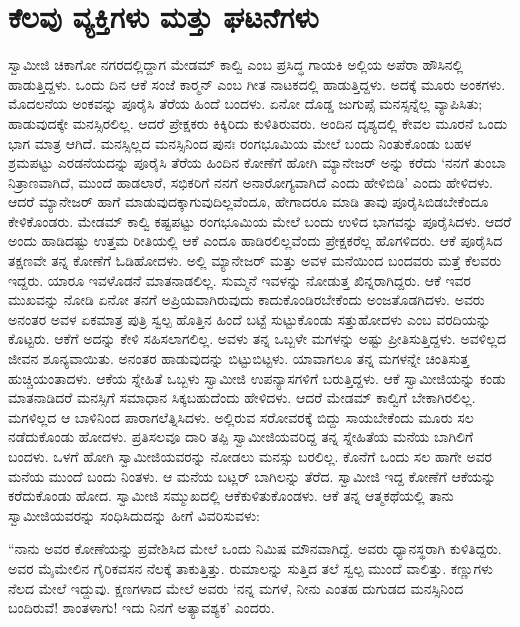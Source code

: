 
\chapter{ಕೆಲವು ವ್ಯಕ್ತಿಗಳು ಮತ್ತು ಘಟನೆಗಳು }

 ಸ್ವಾಮೀಜಿ ಚಿಕಾಗೋ ನಗರದಲ್ಲಿದ್ದಾಗ ಮೇಡಮ್ ಕಾಲ್ವಿ ಎಂಬ ಪ್ರಸಿದ್ಧ ಗಾಯಕಿ ಅಲ್ಲಿಯ ಅಪೆರಾ ಹೌಸಿನಲ್ಲಿ ಹಾಡುತ್ತಿದ್ದಳು. ಒಂದು ದಿನ ಆಕೆ ಸಂಜೆ ಕಾರ್‍ಮನ್ ಎಂಬ ಗೀತ ನಾಟಕದಲ್ಲಿ ಹಾಡುತ್ತಿದ್ದಳು. ಅದಕ್ಕೆ ಮೂರು ಅಂಕಗಳು. ಮೊದಲನೆಯ ಅಂಕವನ್ನು ಪೂರೈಸಿ ತೆರೆಯ ಹಿಂದೆ ಬಂದಳು. ಏನೋ ದೊಡ್ಡ ಜುಗುಪ್ಸೆ ಮನಸ್ಸನ್ನೆಲ್ಲ ವ್ಯಾಪಿಸಿತು; ಹಾಡುವುದಕ್ಕೇ ಮನಸ್ಸಿರಲಿಲ್ಲ. ಆದರೆ ಪ್ರೇಕ್ಷಕರು ಕಿಕ್ಕಿರಿದು ಕುಳಿತಿರುವರು. ಅಂದಿನ ದೃಶ್ಯದಲ್ಲಿ ಕೇವಲ ಮೂರನೆ ಒಂದು ಭಾಗ ಮಾತ್ರ ಆಗಿದೆ. ಮನಸ್ಸಿಲ್ಲದ ಮನಸ್ಸಿನಿಂದ ಪುನಃ ರಂಗಭೂಮಿಯ ಮೇಲೆ ಬಂದು ನಿಂತುಕೊಂಡು ಬಹಳ ಶ್ರಮಪಟ್ಟು ಎರಡನೆಯದನ್ನು ಪೂರೈಸಿ ತೆರೆಯ ಹಿಂದಿನ ಕೋಣೆಗೆ ಹೋಗಿ ಮ್ಯಾನೇಜರ್ ಅನ್ನು ಕರೆದು ‘ನನಗೆ ತುಂಬಾ ನಿತ್ರಾಣವಾಗಿದೆ, ಮುಂದೆ ಹಾಡಲಾರೆ, ಸಭಿಕರಿಗೆ ನನಗೆ ಅನಾರೋಗ್ಯವಾಗಿದೆ ಎಂದು ಹೇಳಿಬಿಡಿ’ ಎಂದು ಹೇಳಿದಳು. ಆದರೆ ಮ್ಯಾನೇಜರ್ ಹಾಗೆ ಮಾಡುವುದಕ್ಕಾಗುವುದಿಲ್ಲವೆಂದೂ, ಹೇಗಾದರೂ ಮಾಡಿ ತಾವು ಪೂರೈಸಿಬಿಡಬೇಕೆಂದೂ ಕೇಳಿಕೊಂಡರು. ಮೇಡಮ್ ಕಾಲ್ವಿ ಕಷ್ಟಪಟ್ಟು ರಂಗಭೂಮಿಯ ಮೇಲೆ ಬಂದು ಉಳಿದ ಭಾಗವನ್ನು ಪೂರೈಸಿದಳು. ಆದರೆ ಅಂದು ಹಾಡಿದಷ್ಟು ಉತ್ತಮ ರೀತಿಯಲ್ಲಿ ಆಕೆ ಎಂದೂ ಹಾಡಿರಲಿಲ್ಲವೆಂದು ಪ್ರೇಕ್ಷಕರೆಲ್ಲ ಹೊಗಳಿದರು. ಆಕೆ ಪೂರೈಸಿದ ತಕ್ಷಣವೇ ತನ್ನ ಕೋಣೆಗೆ ಓಡಿಹೋದಳು. ಅಲ್ಲಿ ಮ್ಯಾನೇಜರ್ ಮತ್ತು ಅವಳ ಮನೆಯಿಂದ ಬಂದವರು ಮತ್ತೆ ಕೆಲವರು ಇದ್ದರು. ಯಾರೂ ಇವಳೊಡನೆ ಮಾತನಾಡಲಿಲ್ಲ. ಸುಮ್ಮನೆ ಇವಳನ್ನು ನೋಡುತ್ತ ಖಿನ್ನರಾಗಿದ್ದರು. ಆಕೆ ಇವರ ಮುಖವನ್ನು ನೋಡಿ ಏನೋ ತನಗೆ ಅಪ್ರಿಯವಾಗಿರುವುದು ಕಾದುಕೊಂಡಿರಬೇಕೆಂದು ಅಂಜತೊಡಗಿದಳು. ಅವರು ಅನಂತರ ಅವಳ ಏಕಮಾತ್ರ ಪುತ್ರಿ ಸ್ವಲ್ಪ ಹೊತ್ತಿನ ಹಿಂದೆ ಬಟ್ಟೆ ಸುಟ್ಟುಕೊಂಡು ಸತ್ತುಹೋದಳು ಎಂಬ ವರದಿಯನ್ನು ಕೊಟ್ಟರು. ಆಕೆಗೆ ಅದನ್ನು ಕೇಳಿ ಸಹಿಸಲಾಗಲಿಲ್ಲ. ಅವಳು ತನ್ನ ಒಬ್ಬಳೇ ಮಗಳನ್ನು ಅಷ್ಟು ಪ್ರೀತಿಸುತ್ತಿದ್ದಳು. ಅವಳಿಲ್ಲದ ಜೀವನ ಶೂನ್ಯವಾಯಿತು. ಅನಂತರ ಹಾಡುವುದನ್ನು ಬಿಟ್ಟುಬಿಟ್ಟಳು. ಯಾವಾಗಲೂ ತನ್ನ ಮಗಳನ್ನೇ ಚಿಂತಿಸುತ್ತ ಹುಚ್ಚಿಯಂತಾದಳು. ಆಕೆಯ ಸ್ನೇಹಿತೆ ಒಬ್ಬಳು ಸ್ವಾಮೀಜಿ ಉಪನ್ಯಾಸಗಳಿಗೆ ಬರುತ್ತಿದ್ದಳು. ಆಕೆ ಸ್ವಾಮೀಜಿಯನ್ನು ಕಂಡು ಮಾತನಾಡಿದರೆ ಮನಸ್ಸಿಗೆ ಸಮಾಧಾನ ಸಿಕ್ಕಬಹುದೆಂದು ಹೇಳಿದಳು. ಆದರೆ ಮೇಡಮ್ ಕಾಲ್ವಿಗೆ ಬೇಕಾಗಿರಲಿಲ್ಲ. ಮಗಳಿಲ್ಲದ ಆ ಬಾಳಿನಿಂದ ಪಾರಾಗಲೆತ್ನಿಸಿದಳು. ಅಲ್ಲಿರುವ ಸರೋವರಕ್ಕೆ ಬಿದ್ದು ಸಾಯಬೇಕೆಂದು ಮೂರು ಸಲ ನಡೆದುಕೊಂಡು ಹೋದಳು. ಪ್ರತಿಸಲವೂ ದಾರಿ ತಪ್ಪಿ ಸ್ವಾಮೀಜಿಯವರಿದ್ದ ತನ್ನ ಸ್ನೇಹಿತೆಯ ಮನೆಯ ಬಾಗಿಲಿಗೆ ಬಂದಳು. ಒಳಗೆ ಹೋಗಿ ಸ್ವಾಮೀಜಿಯವರನ್ನು ನೋಡಲು ಮನಸ್ಸು ಬರಲಿಲ್ಲ. ಕೊನೆಗೆ ಒಂದು ಸಲ ಹಾಗೇ ಅವರ ಮನೆಯ ಮುಂದೆ ಬಂದು ನಿಂತಳು. ಆ ಮನೆಯ ಬಟ್ಲರ್ ಬಾಗಿಲನ್ನು ತೆರೆದ. ಸ್ವಾಮೀಜಿ ಇದ್ದ ಕೋಣೆಗೆ ಆಕೆಯನ್ನು ಕರೆದುಕೊಂಡು ಹೋದ. ಸ್ವಾಮೀಜಿ ಸಮ್ಮುಖದಲ್ಲಿ ಆಕೆ\break ಕುಳಿತುಕೊಂಡಳು. ಆಕೆ ತನ್ನ ಆತ್ಮಕಥೆಯಲ್ಲಿ ತಾನು ಸ್ವಾಮೀಜಿಯವರನ್ನು ಸಂಧಿಸಿದುದನ್ನು ಹೀಗೆ ವಿವರಿಸುವಳು: 

 “ನಾನು ಅವರ ಕೋಣೆಯನ್ನು ಪ್ರವೇಶಿಸಿದ ಮೇಲೆ ಒಂದು ನಿಮಿಷ ಮೌನವಾಗಿದ್ದೆ. ಅವರು ಧ್ಯಾನಸ್ಥರಾಗಿ ಕುಳಿತಿದ್ದರು. ಅವರ ಮೈಮೇಲಿನ ಗೈರಿಕವಸನ ನೆಲಕ್ಕೆ ತಾಕುತ್ತಿತ್ತು. ರುಮಾಲನ್ನು ಸುತ್ತಿದ ತಲೆ ಸ್ವಲ್ಪ ಮುಂದೆ ವಾಲಿತ್ತು. ಕಣ್ಣುಗಳು ನೆಲದ ಮೇಲೆ ಇದ್ದುವು. ಕ್ಷಣಗಳಾದ ಮೇಲೆ ಅವರು ‘ನನ್ನ ಮಗಳೆ, ನೀನು ಎಂತಹ ದುಗುಡದ ಮನಸ್ಸಿನಿಂದ ಬಂದಿರುವೆ! ಶಾಂತಳಾಗು! ಇದು ನಿನಗೆ ಅತ್ಯಾವಶ್ಯಕ’ ಎಂದರು.

